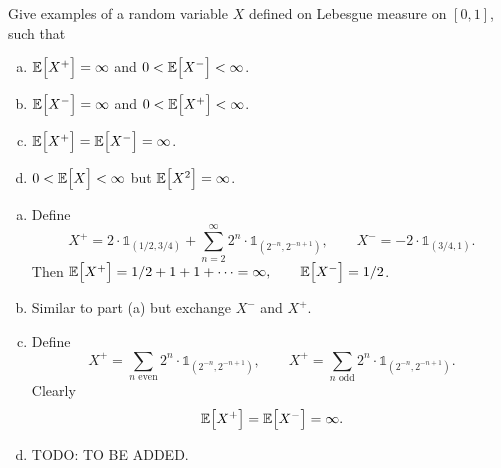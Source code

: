 \begin{problem}
	Give examples of a random variable $ X $ defined on Lebesgue measure on $ [0,1] $, such that 
	\begin{enumerate}[(a)]
		\item $ \mathbb{E}\big[X^+\big] = \infty $ and $ 0 < \mathbb{E}\big[X^-\big] < \infty $.
		\item $ \mathbb{E}\big[X^-\big] = \infty $ and $ 0 < \mathbb{E}\big[X^+\big] < \infty $.
		\item $ \mathbb{E}\big[X^+\big] = \mathbb{E}\big[X^-\big] = \infty $.
		\item $ 0 < \mathbb{E}\big[X\big] < \infty $ but $ \mathbb{E}\big[X^2\big] = \infty $.
	\end{enumerate}
\end{problem}
\begin{solution}
	\begin{enumerate}[(a)]
		\item Define 
		\[ X^+ = 2\cdot \mathds{1}_{(1/2,3/4)} + \sum_{n=2}^\infty 2^n \cdot \mathds{1}_{(2^{-n}, 2^{-n+1})}, 
		\qquad 
		X^- = -2 \cdot \mathds{1}_{(3/4,1)}. \]
		Then $ \mathbb{E}\big[X^+\big] = 1/2 + 1 + 1 + \cdots = \infty, \qquad \mathbb{E}\big[X^-\big] = 1/2 $.
		
		\item Similar to part (a) but exchange $ X^- $ and $ X^+ $.
		
		\item Define
		\[ X^+ = \sum_{n\text{ even}} 2^n \cdot \mathds{1}_{(2^{-n}, 2^{-n+1})}, 
		\qquad 
		X^+ = \sum_{n\text{ odd}} 2^n \cdot \mathds{1}_{(2^{-n}, 2^{-n+1})}. \]
		Clearly
		\[ \mathbb{E}\big[X^+\big] = \mathbb{E}\big[X^-\big] = \infty. \]
		
		\item {\color{red} \noindent TODO: TO BE ADDED.}
 	\end{enumerate}
\end{solution}


